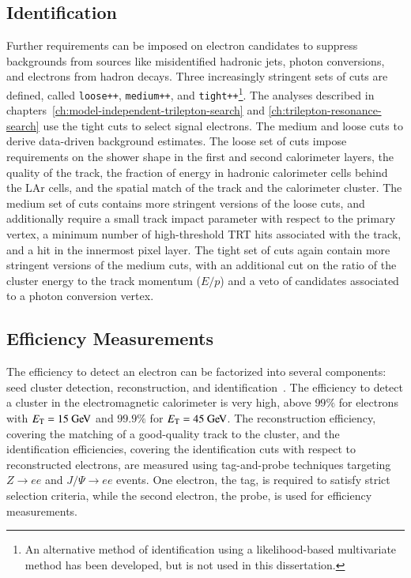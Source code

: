 \subsection{Identification}\label{sec:reco-electron-identification}
Further requirements can be imposed on electron candidates to suppress backgrounds from sources like misidentified hadronic jets, photon conversions, and electrons from hadron decays. Three increasingly stringent sets of cuts are defined, called \texttt{loose++}, \texttt{medium++}, and \texttt{tight++}\footnote{An alternative method of identification using a likelihood-based multivariate method has been developed, but is not used in this dissertation.}. The analyses described in chapters~\ref{ch:model-independent-trilepton-search} and \ref{ch:trilepton-resonance-search} use the tight cuts to select signal electrons. The medium and loose cuts to derive data-driven background estimates. The loose set of cuts impose requirements on the shower shape in the first and second calorimeter layers, the quality of the track, the fraction of energy in hadronic calorimeter cells behind the LAr cells, and the spatial match of the track and the calorimeter cluster. The medium set of cuts contains more stringent versions of the loose cuts, and additionally require a small track impact parameter with respect to the primary vertex, a minimum number of high-threshold TRT hits associated with the track, and a hit in the innermost pixel layer. The tight set of cuts again contain more stringent versions of the medium cuts, with an additional cut on the ratio of the cluster energy to the track momentum ($E/p$) and a veto of candidates associated to a photon conversion vertex. 


\subsection{Efficiency Measurements}\label{sec:reco-electron-efficiency}
The efficiency to detect an electron can be factorized into several components: seed cluster detection, reconstruction, and identification~\cite{TheATLASCollaboration:2014vz}. The efficiency to detect a cluster in the electromagnetic calorimeter is very high, above $99\%$ for electrons with $\Et=15 \GeV$ and $99.9\%$ for $\Et=45 \GeV$. The reconstruction efficiency, covering the matching of a good-quality track to the cluster, and the identification efficiencies, covering the identification cuts with respect to reconstructed electrons, are measured using tag-and-probe techniques targeting $Z\rightarrow ee$ and $J/\Psi\rightarrow ee$ events. One electron, the tag, is required to satisfy strict selection criteria, while the second electron, the probe, is used for efficiency measurements. 

